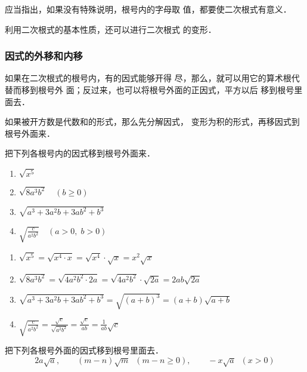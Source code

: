 应当指出，如果没有特殊说明，根号内的字母取
值，都要使二次根式有意义．

利用二次根式的基本性质，还可以进行二次根式
的变形．

\subsubsection{因式的外移和内移}
如果在二次根式的根号内，有的因式能够开得
尽，那么，就可以用它的算术根代替而移到根号外
面；反过来，也可以将根号外面的正因式，平方以后
移到根号里面去．

如果被开方数是代数和的形式，那么先分解因式，
变形为积的形式，再移因式到根号外面来．

\begin{example}
    把下列各根号内的因式移到根号外面来．
    \begin{multicols}{2}
     \begin{enumerate}
    \item $\sqrt{x^{5}}$
    \item $\sqrt{8 a^{3} b^{2}}\quad (b \ge 0)$
    \item $\sqrt{a^{3}+3 a^{2} b+3 a b^{2}+b^{3}}$
    \item $\sqrt{\frac{c}{a^{2} b^{2}}}\quad (a>0,\; b>0)$
\end{enumerate}   
    \end{multicols}

\end{example}


\begin{solution}
\begin{enumerate}
    \item $\sqrt{x^{5}}=\sqrt{x^{4} \cdot x}=\sqrt{x^{4}} \cdot \sqrt{x}=x^{2} \sqrt{x}$
    \item $\sqrt{8 a^{3} b^{2}}=\sqrt{4 a^{2} b^{2} \cdot 2 a}=\sqrt{4 a^{2} b^{2}} \cdot \sqrt{2 a}=2 {a} b \sqrt{2 a}$
    \item $\sqrt{a^{3}+3 a^{2} b+3 ab^{2}+b^{3}}=\sqrt{(a+b)^{3}}=(a+b) \sqrt{a+b}$
    \item $\sqrt{\frac{c}{a^{2} b^{2}}}=\frac{\sqrt{c}}{\sqrt{a^{2} b^{2}}}=\frac{\sqrt{c}}{a b}=\frac{1}{a b} \sqrt{c}$
\end{enumerate}
\end{solution}

\begin{example}
    把下列各根号外面的因式移到根号里面去．
\[2a\sqrt{a},\qquad (m-n)\sqrt{m}\;\; (m-n\ge 0),\qquad -x\sqrt{a}\;\;(x>0) \]
\end{example}

